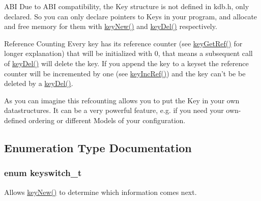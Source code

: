 \begin{DoxyParagraph}{A\-B\-I}
Due to A\-B\-I compatibility, the {\ttfamily Key} structure is not defined in kdb.\-h, only declared. So you can only declare {\ttfamily pointers} to {\ttfamily Keys} in your program, and allocate and free memory for them with \hyperlink{group__key_gad23c65b44bf48d773759e1f9a4d43b89}{key\-New()} and \hyperlink{group__key_ga3df95bbc2494e3e6703ece5639be5bb1}{key\-Del()} respectively.
\end{DoxyParagraph}
\begin{DoxyParagraph}{Reference Counting}
Every key has its reference counter (see \hyperlink{group__key_ga4aabc4272506dd63161db2bbb42de8ae}{key\-Get\-Ref()} for longer explanation) that will be initialized with 0, that means a subsequent call of \hyperlink{group__key_ga3df95bbc2494e3e6703ece5639be5bb1}{key\-Del()} will delete the key. If you append the key to a keyset the reference counter will be incremented by one (see \hyperlink{group__key_ga6970a6f254d67af7e39f8e469bb162f1}{key\-Inc\-Ref()}) and the key can't be be deleted by a \hyperlink{group__key_ga3df95bbc2494e3e6703ece5639be5bb1}{key\-Del()}.
\end{DoxyParagraph}
\begin{DoxyParagraph}{}
As you can imagine this refcounting allows you to put the Key in your own datastructures. It can be a very powerful feature, e.\-g. if you need your own-\/defined ordering or different Models of your configuration. 
\end{DoxyParagraph}


\subsection{Enumeration Type Documentation}
\hypertarget{group__key_ga91fb3178848bd682000958089abbaf40}{
\subsubsection[{keyswitch\-\_\-t}]{\setlength{\rightskip}{0pt plus 5cm}enum {\bf keyswitch\-\_\-t}}}\label{group__key_ga91fb3178848bd682000958089abbaf40}
Allows \hyperlink{group__key_gad23c65b44bf48d773759e1f9a4d43b89}{key\-New()} to determine which information comes next.

